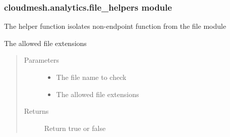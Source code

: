 \documentclass[letterpaper,10pt,english]{sphinxmanual}
\begin{document}
\subsubsection{cloudmesh.analytics.file\_helpers module}
\label{\detokenize{cloudmesh.analytics:module-cloudmesh.analytics.file_helpers}}\label{\detokenize{cloudmesh.analytics:cloudmesh-analytics-file-helpers-module}}
The helper function isolates non-endpoint function from the file module

\begin{fulllineitems}
\label{\detokenize{cloudmesh.analytics:cloudmesh.analytics.file_helpers.allowed}}
The allowed file extensions
\begin{quote}\begin{description}
\item[{Parameters}] \leavevmode\begin{itemize}
\item {} 
 \textendash{} The file name to check

\item {} 
 \textendash{} The allowed file extensions

\end{itemize}

\item[{Returns}] \leavevmode
Return true or false

\end{description}\end{quote}

\end{fulllineitems}

\end{document}
